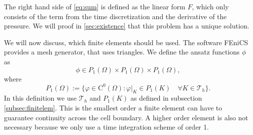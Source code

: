 \documentclass[12pt,a4paper,twoside, open=right]{scrreprt}
\theoremstyle{definition}
\theoremstyle{plain}
\begin{document}
The right hand side of \eqref{eq:sum} is defined as the linear form $F$, which only consists of the term from the time discretization and the derivative of the pressure. We will proof in \ref{sec:existence} that this problem has a unique solution. \par 
We will now discuss, which finite elements should be used. The software FEniCS provides a mesh generator, that uses triangles. We define the ansatz functions $\phi$ as
\begin{equation}
    \phi\in P_1(\Omega)\times P_1(\Omega)\times P_1(\Omega),
\end{equation}
where 
\begin{equation}
    P_1(\Omega):=\{\varphi\in\mathrm{C}^0(\Omega)\colon \varphi|_K\in P_1(K)\quad\forall K\in\mathcal{T}_h\}.
\end{equation}
 In this definition we use $\mathcal{T}_h$ and $P_1(K)$ as defined in subsection \ref{subsec:finitelem}. This is the smallest order a finite element can have to guarantee continuity across the cell boundary. A higher order element is also not necessary because we only use a time integration scheme of order 1. 
\end{document}
